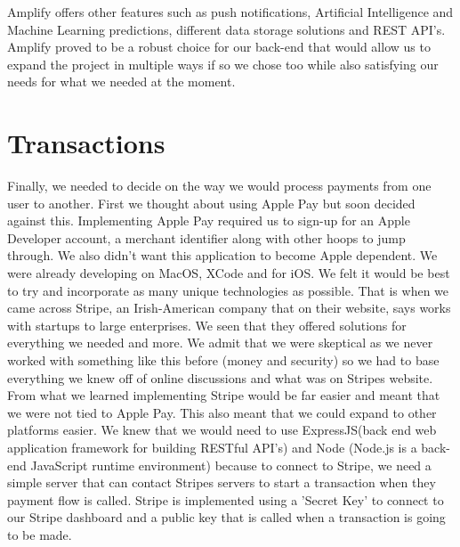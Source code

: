 Amplify offers other features such as push notifications, Artificial Intelligence and Machine Learning predictions, different data storage solutions and REST API's. Amplify proved to be a robust choice for our back-end that would allow us to expand the project in multiple ways if so we chose too while also satisfying our needs for what we needed at the moment\cite{amplifyFeatures}.
\section{Transactions}
Finally, we needed to decide on the way we would process payments from one user to another. First we thought about using Apple Pay but soon decided against this. Implementing Apple Pay required us to sign-up for an Apple Developer account, a merchant identifier along with other hoops to jump through\cite{ApplePaySettingUp}. We also didn't want this application to become Apple dependent. We were already developing on MacOS, XCode and for iOS. We felt it would be best to try and incorporate as many unique technologies as possible. That is when we came across Stripe, an Irish-American company that on their website, says works with startups to large enterprises. We seen that they offered solutions for everything we needed and more. We admit that we were skeptical as we never worked with something like this before (money and security) so we had to base everything we knew off of online discussions and what was on Stripes website\cite{stripe}. From what we learned implementing Stripe would be far easier and meant that we were not tied to Apple Pay. This also meant that we could expand to other platforms easier. We knew that we would need to use ExpressJS(back end web application framework for building RESTful API's) and Node (Node.js is a back-end JavaScript runtime environment) because to connect to Stripe, we need a simple server that can contact Stripes servers to start a transaction when they payment flow is called. Stripe is implemented using a 'Secret Key' to connect to our Stripe dashboard and a public key that is called when a transaction is going to be made.